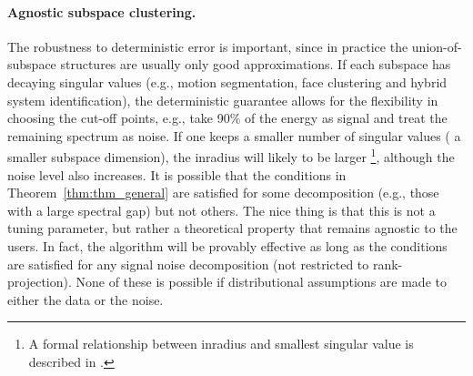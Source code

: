 \documentclass[twoside,11pt]{article}
\numberwithin{equation}{section}
\begin{document}
\paragraph{Agnostic subspace clustering.}
The robustness to deterministic error is important, since in practice the union-of-subspace structures are usually only good approximations. If each subspace has decaying singular values (e.g., motion segmentation, face clustering \citep{elhamifar2012ssc_journal} and hybrid system identification\citep{vidal2003algebraic}), the deterministic guarantee allows for the flexibility in choosing the cut-off points, e.g., take 90\% of the energy as signal and treat the remaining spectrum as noise. If one keeps a smaller number of singular values ( a smaller subspace dimension), the inradius will likely to be larger \footnote{A formal relationship between inradius and smallest singular value is described in \citep{wang2013provable}.}, although the noise level also increases. It is  possible that the conditions in Theorem~\ref{thm:thm_general} are satisfied for some decomposition (e.g., those with a large spectral gap) but not others. The nice thing is that this is not a tuning parameter, but rather a theoretical property that remains agnostic to the users. In fact, the algorithm will be provably effective as long as the conditions are satisfied for any signal noise decomposition (not restricted to rank-projection). None of these is possible if distributional assumptions are made to either the data or the noise.











\end{document}
